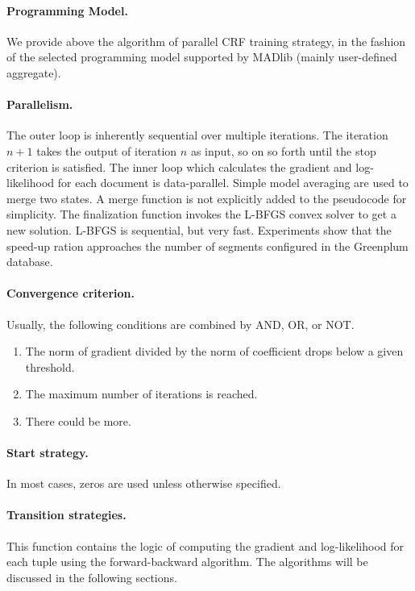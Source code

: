 \documentclass[11pt,letterpaper]{article}
\begin{document}
\paragraph{Programming Model.}
We provide above the algorithm of parallel CRF training strategy, in the fashion of the selected programming model supported by MADlib (mainly user-defined aggregate).

\paragraph{Parallelism.}
The outer loop is inherently sequential over multiple iterations.
The iteration $n+1$ takes the output of iteration $n$ as input, so on so forth until the stop criterion is satisfied.
The inner loop which calculates the gradient and log-likelihood for each document is data-parallel.
Simple model averaging are used to merge two states.
A merge function is not explicitly added to the pseudocode for simplicity.
The finalization function invokes the L-BFGS convex solver to get a new solution. L-BFGS is sequential, but very fast.
Experiments show that the speed-up ration approaches the number of segments configured in the Greenplum database.

\paragraph{Convergence criterion.}
Usually, the following conditions are combined by AND, OR, or NOT.
\begin{enumerate}
    \item The norm of gradient divided by the norm of coefficient drops below a given threshold.
    \item The maximum number of iterations is reached.
    \item There could be more.
\end{enumerate}

\paragraph{Start strategy.}
In most cases, zeros are used unless otherwise specified.

\paragraph{Transition strategies.}
This function contains the logic of computing the gradient and log-likelihood for each tuple using the forward-backward
algorithm. The algorithms will be discussed in the following sections.
\end{document}
